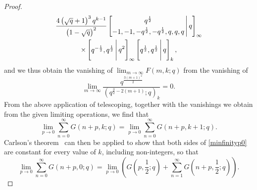 \documentclass[12pt]{article}
\begin{document}
\begin{proof}
\begin{multline*}
 \frac{4 \left(\sqrt{q}+1\right)^3 q^{k-1}}{\left(1-\sqrt{q}\right)^2} 
 \left[ \begin{matrix} q^{\frac{1}{2}} \vspace{1mm} \\ 
 -1, -1, -q^{\frac{1}{2}}, -q^{\frac{1}{2}}, q, q, q \end{matrix} \, \Bigg| \, q \right]_{\infty} \\ 
 \times \left[ \begin{matrix} 
 q^{-\frac{1}{2}}, q^{\frac{1}{2}} \end{matrix} \, \Bigg| \, q^{2} \right]_{\infty} 
 \left[ \begin{matrix} q^{\frac{1}{2}}, q^{\frac{1}{2}} \end{matrix} \, \Bigg| \, q \right]_{k}, 
\end{multline*}
 and we thus obtain the vanishing of 
 $\lim_{m \to \infty} F(m, k; q)$ 
 from the vanishing of 
 $$ \lim_{m \to 
 \infty} \frac{ q^{\frac{3 (m + 
 1)^2 }{2}} }{ \left( q^{\frac{3}{2} - 2(m + 1)}; q \right)_{k} } = 0. $$
 From the above application of telescoping, together with 
 the vanishings we obtain 
 from the given limiting operations, we find that 
\begin{equation}\label{minfinityp0}
 \lim_{p \to 0} \sum_{n=0}^{\infty} 
 G(n+p,k;q) = \lim_{p \to 0} \sum_{n=0}^{\infty} 
 G(n+p,k+1; q). 
\end{equation}
 Carlson's theorem~\cite[\S5.3]{Bailey1935} can then be applied to show that both sides of \eqref{minfinityp0} are constant 
 for every value of $k$, including non-integers, so that 
\begin{equation}\label{consequenceCarlson1935}
 \lim_{p \to 0} \sum_{n=0}^{\infty} 
 G(n+p,0;q) = \lim_{p \to 0} \left( G\left( p, \frac{1}{2}; q \right) + \sum_{n = 1}^{\infty} 
 G\left(n+p,\frac{1}{2}; q \right) \right). 
\end{equation}


\end{proof}
\end{document}
